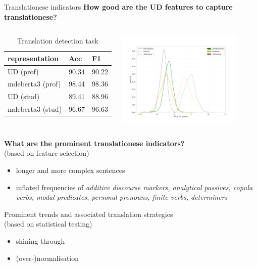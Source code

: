 \documentclass[11pt]{beamer} %
\begin{document}
\begin{frame}{Translationese indicators}
\textbf{How good are the UD features to capture translationese?}
	\begin{columns}
		\begin{table}[H]
			\begin{tabular}{l|ll}
				\toprule
				representation    & Acc      & F1   \\
				\midrule
				UD (prof)       & 90.34 & 90.22 \\
				mdeberta3 (prof) & 98.44 & 98.36 \\
				\hline
				UD (stud)   & 89.41 & 88.96  \\
				mdeberta3 (stud) & 96.67 & 96.63 \\
				
				\bottomrule
			\end{tabular}
			\caption{\label{tab:stu-ref}Translation detection task}
		\end{table}
				\includegraphics[width=6cm]{pca/src-var-ttype-ud-PCA-D1-lines}
		
   \end{columns}
	
\end{frame}

\begin{frame}{}
	\textbf{What are the prominent translationese indicators?}\\
	(based on feature selection)
	\begin{itemize}
		\item longer and more complex sentences
		\item inflated frequencies of \textit{additive discourse markers, analytical passives, copula verbs, modal predicates, personal pronouns, finite verbs, determiners}
	\end{itemize}
	
	\bigskip
	
	Prominent trends and associated translation strategies \\
	(based on statistical testing)
	\begin{itemize}
		\item shining through
		\item (over-)normalisation
	\end{itemize}
\end{frame}
\end{document}
